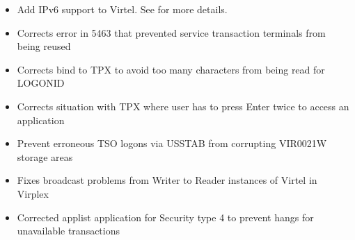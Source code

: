 \documentclass[letterpaper,10pt,english]{sphinxmanual}
\begin{document}
\begin{itemize}
\item {} 
Add IPv6 support to Virtel. See  for more details.

\end{itemize}

\begin{itemize}
\item {} 
Corrects error in 5463 that prevented service transaction terminals from being reused

\end{itemize}

\begin{itemize}
\item {} 
Corrects bind to TPX to avoid too many characters from being read for LOGONID

\end{itemize}

\begin{itemize}
\item {} 
Corrects situation with TPX where user has to press Enter twice to access an application

\end{itemize}

\begin{itemize}
\item {} 
Prevent erroneous TSO logons via USSTAB from corrupting VIR0021W storage areas

\end{itemize}

\begin{itemize}
\item {} 
Fixes broadcast problems from Writer to Reader instances of Virtel in Virplex

\end{itemize}

\begin{itemize}
\item {} 
Corrected applist application for Security type 4 to prevent hangs for unavailable transactions

\end{itemize}
\end{document}
